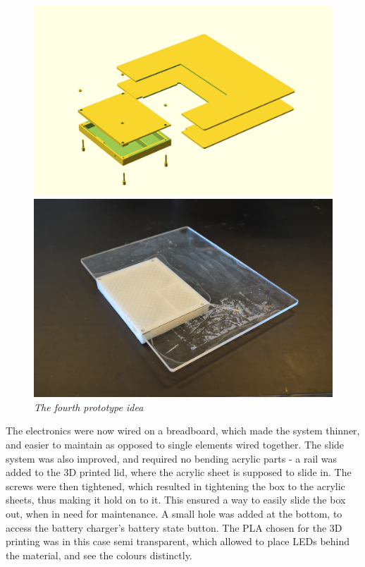 \begin{figure}[h]
\setlength{\belowcaptionskip}{-5mm}
\begin{minipage}[b]{.5\textwidth}
\includegraphics[width=1.05\textwidth]{figures/iterations/v6.png}
\end{minipage}
\begin{minipage}[b]{.5\textwidth}
\includegraphics[width=1\textwidth]{figures/iterations/v6-photo.jpg}
\end{minipage}
\caption{\small {\it {The fourth prototype idea}}} 
\label{fig:v5}
\end{figure}

The electronics were now wired on a breadboard, which made the system thinner, and easier to maintain as opposed to single elements wired together. The slide system was also improved, and required no bending acrylic parts - a rail was added to the 3D printed lid, where the acrylic sheet is supposed to slide in. The screws were then tightened, which resulted in tightening the box to the acrylic sheets, thus making it hold on to it. This ensured a way to easily slide the box out, when in need for maintenance. A small hole was added at the bottom, to access the battery charger's battery state button. The PLA chosen for the 3D printing was in this case semi transparent, which allowed to place LEDs behind the material, and see the colours distinctly.

